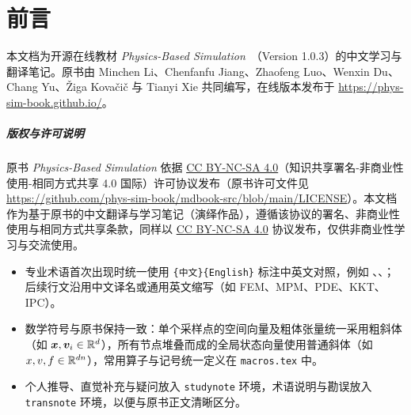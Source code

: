 \chapter*{前言}

本文档为开源在线教材 \textit{Physics-Based Simulation}~\cite{li2026physics}（Version 1.0.3）的中文学习与翻译笔记。原书由 Minchen Li、Chenfanfu Jiang、Zhaofeng Luo、Wenxin Du、Chang Yu、Žiga Kovačič 与 Tianyi Xie 共同编写，在线版本发布于 \url{https://phys-sim-book.github.io/}。

\paragraph{版权与许可说明}
原书 \textit{Physics-Based Simulation} 依据 \href{https://creativecommons.org/licenses/by-nc-sa/4.0/}{CC BY-NC-SA 4.0}（知识共享署名-非商业性使用-相同方式共享 4.0 国际）许可协议发布（原书许可文件见 \url{https://github.com/phys-sim-book/mdbook-src/blob/main/LICENSE}）。本文档作为基于原书的中文翻译与学习笔记（演绎作品），遵循该协议的署名、非商业性使用与相同方式共享条款，同样以 \href{https://creativecommons.org/licenses/by-nc-sa/4.0/}{CC BY-NC-SA 4.0} 协议发布，仅供非商业性学习与交流使用。

\begin{transnote}[翻译与笔记约定]
  \begin{itemize}
    \item 专业术语首次出现时统一使用 \texttt{\string\term\{中文\}\{English\}} 标注中英文对照，例如 、、；后续行文沿用中文译名或通用英文缩写（如 FEM、MPM、PDE、KKT、IPC）。
    \item 数学符号与原书保持一致：单个采样点的空间向量及粗体张量统一采用粗斜体 \texttt{\string\boldsymbol}（如 $\boldsymbol{x}, \boldsymbol{v}_i \in \mathbb{R}^d$），所有节点堆叠而成的全局状态向量使用普通斜体（如 $x, v, f \in \mathbb{R}^{dn}$），常用算子与记号统一定义在 \texttt{macros.tex} 中。
    \item 个人推导、直觉补充与疑问放入 \texttt{studynote} 环境，术语说明与勘误放入 \texttt{transnote} 环境，以便与原书正文清晰区分。
  \end{itemize}
\end{transnote}
